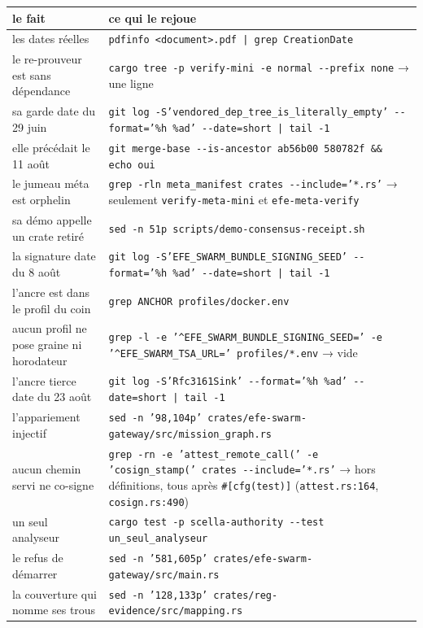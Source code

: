 \documentclass[10pt]{article}
\newcommand{\code}[1]{\texttt{\small #1}}
\newcommand{\loc}[1]{{\footnotesize\color{grey}\texttt{#1}}}
\begin{document}
{\small
\renewcommand{\arraystretch}{1.16}
\begin{longtable}{@{}L{4.4cm}L{12.8cm}@{}}
\toprule
\textbf{le fait} & \textbf{ce qui le rejoue} \\ \midrule \endhead
les dates réelles & \code{pdfinfo <document>.pdf | grep CreationDate} \\
le re-prouveur est sans dépendance & \code{cargo tree -p verify-mini -e normal -{}-prefix none} → une ligne \\
sa garde date du 29 juin & \code{git log -S'vendored\_dep\_tree\_is\_literally\_empty' -{}-format='\%h \%ad' -{}-date=short | tail -1} \\
elle précédait le 11 août & \code{git merge-base -{}-is-ancestor ab56b00 580782f \&\& echo oui} \\
le jumeau méta est orphelin & \code{grep -rln meta\_manifest crates -{}-include='*.rs'} → seulement \code{verify-meta-mini} et \code{efe-meta-verify} \\
sa démo appelle un crate retiré & \code{sed -n 51p scripts/demo-consensus-receipt.sh} \\
la signature date du 8 août & \code{git log -S'EFE\_SWARM\_BUNDLE\_SIGNING\_SEED' -{}-format='\%h \%ad' -{}-date=short | tail -1} \\
l'ancre est dans le profil du coin & \code{grep ANCHOR profiles/docker.env} \\
aucun profil ne pose graine ni horodateur & \code{grep -l -e '\textasciicircum{}EFE\_SWARM\_BUNDLE\_SIGNING\_SEED=' -e '\textasciicircum{}EFE\_SWARM\_TSA\_URL=' profiles/*.env} → vide \\
l'ancre tierce date du 23 août & \code{git log -S'Rfc3161Sink' -{}-format='\%h \%ad' -{}-date=short | tail -1} \\
l'appariement injectif & \code{sed -n '98,104p' crates/efe-swarm-gateway/src/mission\_graph.rs} \\
aucun chemin servi ne co-signe & \code{grep -rn -e 'attest\_remote\_call(' -e 'cosign\_stamp(' crates -{}-include='*.rs'} → hors définitions, tous après \code{\#[cfg(test)]} (\loc{attest.rs:164}, \loc{cosign.rs:490}) \\
un seul analyseur & \code{cargo test -p scella-authority -{}-test un\_seul\_analyseur} \\
le refus de démarrer & \code{sed -n '581,605p' crates/efe-swarm-gateway/src/main.rs} \\
la couverture qui nomme ses trous & \code{sed -n '128,133p' crates/reg-evidence/src/mapping.rs} \\

\end{longtable}}
\end{document}
